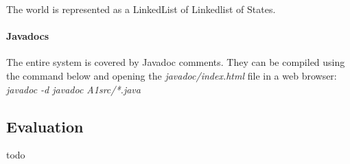 \documentclass[letterpaper,12pt]{article}
\begin{document}
The world is represented as a LinkedList of Linkedlist of States.

\paragraph{Javadocs}

The entire system is covered by Javadoc comments. They can be compiled using the command below and opening the \textit{javadoc/index.html} file in a web browser:\\

\textit{javadoc -d javadoc A1src/*.java}

\subsection{Evaluation}

todo

\end{document}
